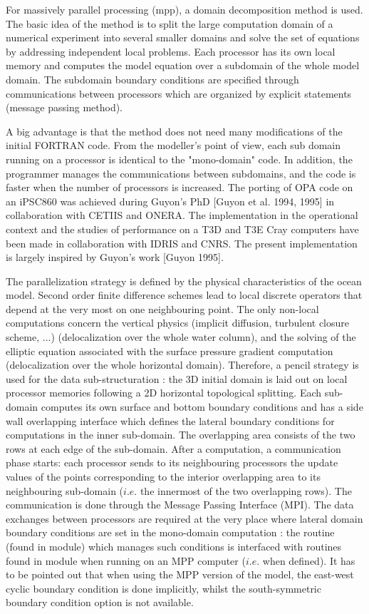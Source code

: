 \documentclass[NEMO_book]{subfiles}
\begin{document}
For massively parallel processing (mpp), a domain decomposition method is used. 
The basic idea of the method is to split the large computation domain of a numerical 
experiment into several smaller domains and solve the set of equations by addressing 
independent local problems. Each processor has its own local memory and computes 
the model equation over a subdomain of the whole model domain. The subdomain 
boundary conditions are specified through communications between processors 
which are organized by explicit statements (message passing method). 

A big advantage is that the method does not need many modifications of the initial 
FORTRAN code. From the modeller's point of view, each sub domain running on 
a processor is identical to the "mono-domain" code. In addition, the programmer 
manages the communications between subdomains, and the code is faster when 
the number of processors is increased. The porting of OPA code on an iPSC860 
was achieved during Guyon's PhD [Guyon et al. 1994, 1995] in collaboration with 
CETIIS and ONERA. The implementation in the operational context and the studies 
of performance on a T3D and T3E Cray computers have been made in collaboration 
with IDRIS and CNRS. The present implementation is largely inspired by Guyon's 
work  [Guyon 1995].

The parallelization strategy is defined by the physical characteristics of the 
ocean model. Second order finite difference schemes lead to local discrete 
operators that depend at the very most on one neighbouring point. The only 
non-local computations concern the vertical physics (implicit diffusion, 
turbulent closure scheme, ...) (delocalization over the whole water column), 
and the solving of the elliptic equation associated with the surface pressure 
gradient computation (delocalization over the whole horizontal domain). 
Therefore, a pencil strategy is used for the data sub-structuration 
: the 3D initial domain is laid out on local processor 
memories following a 2D horizontal topological splitting. Each sub-domain 
computes its own surface and bottom boundary conditions and has a side 
wall overlapping interface which defines the lateral boundary conditions for 
computations in the inner sub-domain. The overlapping area consists of the 
two rows at each edge of the sub-domain. After a computation, a communication 
phase starts: each processor sends to its neighbouring processors the update 
values of the points corresponding to the interior overlapping area to its 
neighbouring sub-domain ($i.e.$ the innermost of the two overlapping rows). 
The communication is done through the Message Passing Interface (MPI). 
The data exchanges between processors are required at the very 
place where lateral domain boundary conditions are set in the mono-domain 
computation : the  routine (found in  module) 
which manages such conditions is interfaced with routines found in  module 
when running on an MPP computer ($i.e.$ when  defined). 
It has to be pointed out that when using the MPP version of the model, 
the east-west cyclic boundary condition is done implicitly, 
whilst the south-symmetric boundary condition option is not available.
\end{document}
